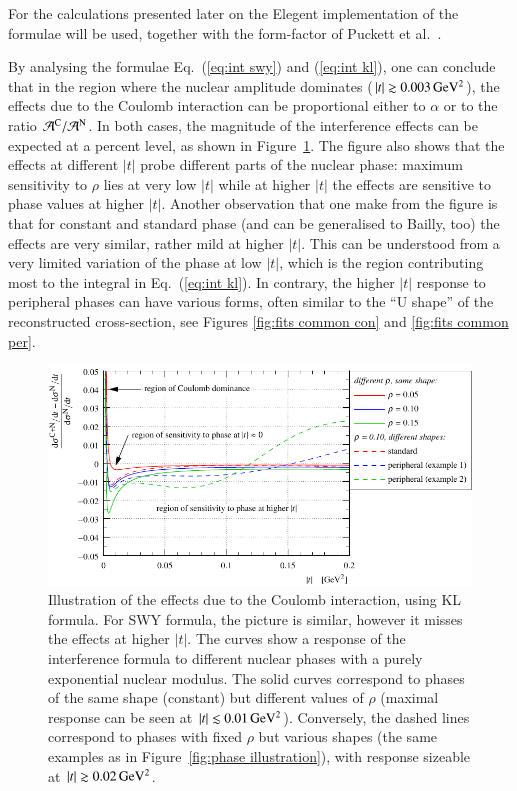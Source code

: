For the calculations presented later on the Elegent implementation \cite{elegent} of the formulae will be used, together with the form-factor of Puckett et al.~\cite{puckett10}.

By analysing the formulae Eq.~(\ref{eq:int swy}) and (\ref{eq:int kl}), one can conclude that in the region where the nuclear amplitude dominates ($|t| \gtrsim 0.003\,{\rm GeV^2}$), the effects due to the Coulomb interaction can be proportional either to $\alpha$ or to the ratio ${\cal A}^{\rm C} / {\cal A}^{\rm N}$. In both cases, the magnitude of the interference effects can be expected at a percent level, as shown in Figure~\ref{fig:cni effect}. The figure also shows that the effects at different $|t|$ probe different parts of the nuclear phase: maximum sensitivity to $\rho$ lies at very low $|t|$ while at higher $|t|$ the effects are sensitive to phase values at higher $|t|$. Another observation that one make from the figure is that for constant and standard phase (and can be generalised to Bailly, too) the effects are very similar, rather mild at higher $|t|$. This can be understood from a very limited variation of the phase at low $|t|$, which is the region contributing most to the integral in Eq.~(\ref{eq:int kl}). In contrary, the higher $|t|$ response to peripheral phases can have various forms, often similar to the ``U shape'' of the reconstructed cross-section, see Figures \ref{fig:fits common con} and \ref{fig:fits common per}.



\begin{figure}
\begin{center}
\includegraphics{fig/cni_effect_illustration.pdf}
\caption{%
Illustration of the effects due to the Coulomb interaction, using KL formula. For SWY formula, the picture is similar, however it misses the effects at higher $|t|$. The curves show a response of the interference formula to different nuclear phases with a purely exponential nuclear modulus. The solid curves correspond to phases of the same shape (constant) but different values of $\rho$ (maximal response can be seen at $|t| \lesssim 0.01\,{\rm GeV^2}$). Conversely, the dashed lines correspond to phases with fixed $\rho$ but various shapes (the same examples as in Figure~\ref{fig:phase illustration}), with response sizeable at $|t| \gtrsim 0.02\,{\rm GeV^2}$.
}
\label{fig:cni effect}
\end{center}
\end{figure}

